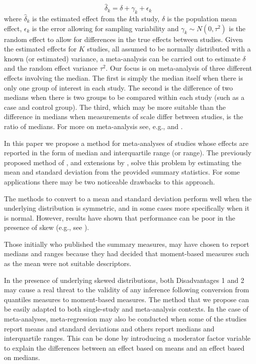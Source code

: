\documentclass{article}
\begin{document}
\begin{equation}
\widehat{\delta}_k=\delta + \gamma_k + \epsilon_k
\end{equation}
where $\widehat{\delta}_k$ is the estimated effect from the $k$th study, $\delta$ is the population mean effect, $\epsilon_k$ is the error allowing for sampling variability and $\gamma_k\sim N(0,\tau^2)$ is the random effect to allow for differences in the true effects between studies.  Given the estimated effects for $K$ studies, all assumed to be normally distributed with a known (or estimated) variance, a meta-analysis can be carried out to estimate $\delta$ and the random effect variance $\tau^2$.  Our focus is on meta-analysis of three different effects involving the median.  The first is simply the median itself when there is only one group of interest in each study.  The second is the difference of two medians when there is two groups to be compared within each study (such as a case and control group).  The third, which may be more suitable than the difference in medians when measurements of scale differ between studies, is the ratio of medians.   For more on meta-analysis see, e.g., \cite{borenstein2008introduction} and \cite{kulinskaya2008meta}.

In this paper we propose a method for meta-analyses of studies whose effects are reported in the form of median and interquartile range (or range). The previously proposed method of \cite{Hozo2005}, and extensions by \cite{Bland2015, Wan2014}, solve this problem by estimating the mean and standard deviation from the provided summary statistics. For some applications there may be two noticeable drawbacks to this approach.

\begin{disadv}\label{disadv:1}
The methods to convert to a mean and standard deviation perform well when the underlying distribution is symmetric, and in some cases more specifically when it is normal.  However, results have shown that performance can be poor in the presence of skew (e.g., see \cite{shi2018estimate}).
\end{disadv}

\begin{disadv}\label{disadv:2}
Those initially who published the summary measures, may have chosen to report medians and ranges because they had decided that moment-based measures such as the mean were not suitable descriptors.
\end{disadv}

In the presence of underlying skewed distributions, both Disadvantages 1 and 2 may cause a real threat to the validity of any inference following conversion from quantiles measures to moment-based measures.  The method that we propose can be easily adapted to both single-study and meta-analysis contexts.  In the case of meta-analyses, meta-regression may also be conducted when some of the studies report means and standard deviations and others report medians and interquartile ranges.  This can be done by introducing a moderator factor variable to explain the differences between an effect based on means and an effect based on medians.
\end{document}
